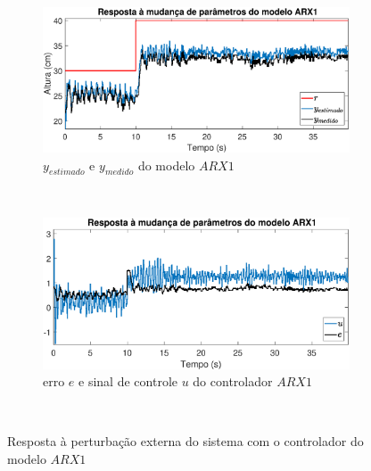 \begin{figure}[H]
	\centering
	\begin{subfigure}[b]{1\textwidth}
		\includegraphics[width=1\linewidth]{mprarx1y}
		\caption[$y_{estimado}$ e $y_{medido}$ do modelo $ARX1$]{$y_{estimado}$ e $y_{medido}$ do modelo $ARX1$}
		\label{fig:mprarx1y}
	\end{subfigure}
	~ %
	\begin{subfigure}[b]{1\textwidth}
		\includegraphics[width=1\linewidth]{mprarx1e}
		\caption[erro $e$ e sinal de controle $u$ do controlador $ARX1$]{erro $e$ e sinal de controle $u$ do controlador $ARX1$}
		\label{fig:mprarx1e}
	\end{subfigure}
	~ %
	
	\caption{Resposta à perturbação externa do sistema com o controlador do modelo $ARX1$}\label{fig:mprarx1}
\end{figure}



